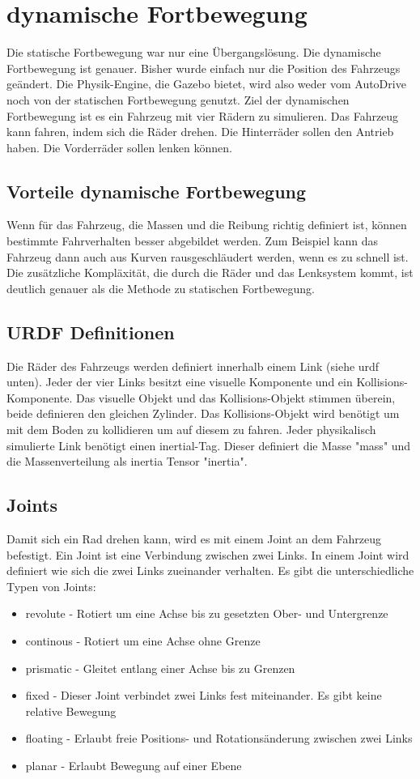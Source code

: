 \section{dynamische Fortbewegung}
Die statische Fortbewegung war nur eine Übergangslösung.
Die dynamische Fortbewegung ist genauer. Bisher wurde einfach nur die Position des Fahrzeugs geändert.
Die Physik-Engine, die Gazebo bietet, wird also weder vom AutoDrive noch von der statischen Fortbewegung genutzt.
Ziel der dynamischen Fortbewegung ist es ein Fahrzeug mit vier Rädern zu simulieren.
Das Fahrzeug kann fahren, indem sich die Räder drehen.
Die Hinterräder sollen den Antrieb haben.
Die Vorderräder sollen lenken können.

\subsection*{Vorteile dynamische Fortbewegung}
Wenn für das Fahrzeug, die Massen und die Reibung richtig definiert ist, können bestimmte Fahrverhalten besser abgebildet werden.
Zum Beispiel kann das Fahrzeug dann auch aus Kurven rausgeschläudert werden, wenn es zu schnell ist.
Die zusätzliche Kompläxität, die durch die Räder und das Lenksystem kommt, ist deutlich genauer als die Methode zu statischen Fortbewegung.

\subsection*{URDF Definitionen}
Die Räder des Fahrzeugs werden definiert innerhalb einem Link (siehe urdf unten).
Jeder der vier Links besitzt eine visuelle Komponente und ein Kollisions-Komponente.
Das visuelle Objekt und das Kollisions-Objekt stimmen überein, beide definieren den gleichen Zylinder.
Das Kollisions-Objekt wird benötigt um mit dem Boden zu kollidieren um auf diesem zu fahren.
Jeder physikalisch simulierte Link benötigt einen inertial-Tag.
Dieser definiert die Masse "mass" und die Massenverteilung als inertia Tensor "inertia".

\subsection*{Joints}
Damit sich ein Rad drehen kann, wird es mit einem Joint an dem Fahrzeug befestigt.
Ein Joint ist eine Verbindung zwischen zwei Links. 
In einem Joint wird definiert wie sich die zwei Links zueinander verhalten.
Es gibt die unterschiedliche Typen von Joints:
\begin{itemize}
    \item revolute - Rotiert um eine Achse bis zu gesetzten Ober- und Untergrenze
    \item continous - Rotiert um eine Achse ohne Grenze
    \item prismatic - Gleitet entlang einer Achse bis zu Grenzen
    \item fixed - Dieser Joint verbindet zwei Links fest miteinander. Es gibt keine relative Bewegung
    \item floating - Erlaubt freie Positions- und Rotationsänderung zwischen zwei Links
    \item planar - Erlaubt Bewegung auf einer Ebene
\end{itemize}
\cite{Joint}

